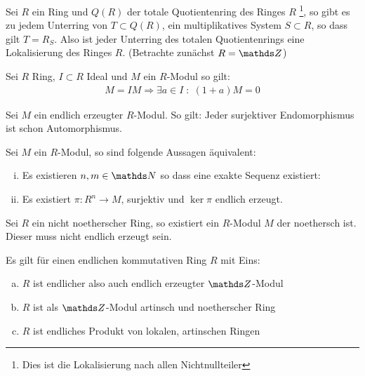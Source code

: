 \documentclass[ngerman, parskip=half, titlepage=false]{scrartcl}
\begin{document}
\begin{Beh}
  Sei $R$ ein Ring und $Q(R)$ der totale Quotientenring des Ringes $R$
  \footnote{Dies ist die Lokalisierung nach allen Nichtnullteiler},
  so gibt es zu  jedem Unterring von $T \subset Q(R)$, ein multiplikatives
  System $S \subset R$, so dass gilt $T = R_S$.
  Also ist jeder Unterring des totalen Quotientenrings eine Lokalisierung des 
  Ringes $R$. (Betrachte zunächst $R = \Z$)
\end{Beh}

\begin{Satz}
  Sei $R$ Ring, $I \subset R$ Ideal und $M$ ein $R$-Modul so gilt:\\
  \begin{gather*}
    M = IM \Rightarrow  \exists a \in I \; : \; (1+a)M=0
  \end{gather*}
\end{Satz}

\begin{Lem}
  Sei $M$ ein endlich erzeugter $R$-Modul. So gilt:
  Jeder surjektiver Endomorphismus ist schon Automorphismus.
\end{Lem}

\begin{Satz}
  Sei $M$ ein $R$-Modul, so sind folgende Aussagen äquivalent:\\
  \begin{enumerate}[i)]
    \item Es existieren $n,m \in \N$ so dass eine exakte Sequenz existiert:\\
    \item Es existiert $\pi : R^n \rightarrow M$, surjektiv und
      $\ker \pi$ endlich erzeugt.
    \end{enumerate}
  \end{Satz}

\begin{Beh}
  Sei $R$ ein nicht noetherscher Ring, so existiert ein $R$-Modul $M$ der
   noethersch ist. Dieser muss nicht endlich erzeugt sein.
\end{Beh}

\begin{Satz}
  Es gilt für einen endlichen kommutativen Ring $R$ mit Eins:\\
  \begin{enumerate}[a)]
    \item $R$ ist endlicher also auch endlich erzeugter $\Z$-Modul
    \item $R$ ist als $\Z$-Modul artinsch und noetherscher Ring
    \item $R$ ist endliches Produkt von lokalen, artinschen Ringen
  \end{enumerate}
\end{Satz}
\end{document}
